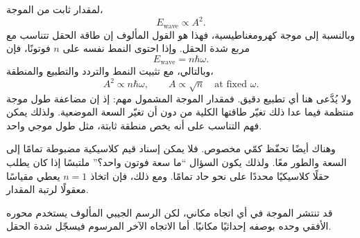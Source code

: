لمقدار ثابت من الموجة،
\begin{equation}
E_{\text{wave}}\propto A^2.
\end{equation}
وبالنسبة إلى موجة كهرومغناطيسية، فهذا هو القول المألوف إن طاقة الحقل تتناسب مع مربع شدة الحقل. وإذا احتوى النمط نفسه على \(n\) فوتونًا، فإن
\begin{equation}
E_{\text{wave}}=n\hbar\omega.
\end{equation}
وبالتالي، مع تثبيت النمط والتردد والتطبيع والمنطقة،
\begin{equation}
A^2\propto n\hbar\omega,
\qquad
A\propto\sqrt n\quad\text{at fixed }\omega.
\end{equation}
ولا يُدَّعى هنا أي تطبيع دقيق. فمقدار الموجة المشمول مهم: إذ إن مضاعفة طول موجة منتظمة فيما عدا ذلك تغيّر طاقتها الكلية من دون أن تغيّر السعة الموضعية. ولذلك يمكن فهم التناسب على أنه يخص منطقة ثابتة، مثل طول موجي واحد.

وهناك أيضًا تحفّظ كمّي مخصوص. فلا يمكن إسناد قيم كلاسيكية مضبوطة تمامًا إلى السعة والطور معًا. ولذلك يكون السؤال ``ما سعة فوتون واحد؟'' ملتبسًا إذا كان يطلب حقلًا كلاسيكيًا محددًا على نحو حاد تمامًا. ومع ذلك، فإن اتخاذ \(n=1\) يعطي مقياسًا معقولًا لرتبة المقدار.

\begin{classroomqa}
\end{classroomqa}

قد تنتشر الموجة في أي اتجاه مكاني، لكن الرسم الجيبي المألوف يستخدم محوره الأفقي وحده بوصفه إحداثيًا مكانيًا. أما الاتجاه الآخر المرسوم فيسجّل شدة الحقل.

\begin{classroomqa}
\end{classroomqa}

\begin{classroomqa}
\end{classroomqa}


